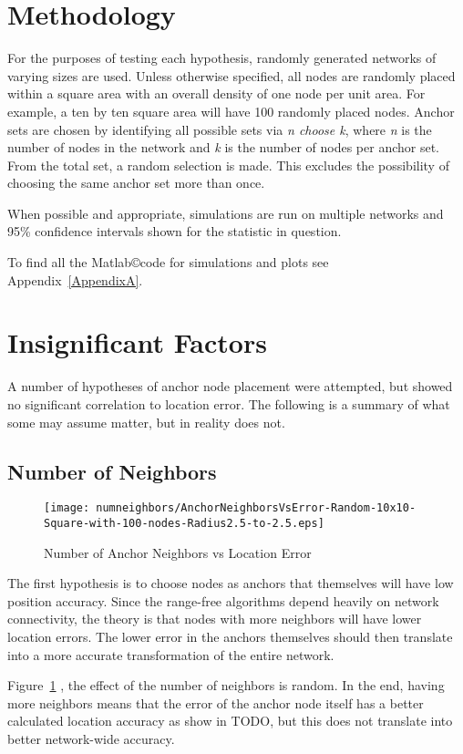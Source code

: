\section{Methodology}
For the purposes of testing each hypothesis, randomly generated networks of varying sizes are used.  Unless otherwise specified, all nodes are randomly placed within a square area with an overall density of one node per unit area.  For example, a ten by ten square area will have 100 randomly placed nodes.  Anchor sets are chosen by identifying all possible sets via \emph{n choose k}, where \emph{n} is the number of nodes in the network and \emph{k} is the number of nodes per anchor set.  From the total set, a random selection is made.  This excludes the possibility of choosing the same anchor set more than once.

When possible and appropriate, simulations are run on multiple networks and 95\% confidence intervals shown for the statistic in question.  

To find all the Matlab\copyright code for simulations and plots see Appendix~\ref{AppendixA}.

\section{Insignificant Factors}
A number of hypotheses of anchor node placement were attempted, but showed no significant correlation to location error.  The following is a summary of what some may assume matter, but in reality does not.

\subsection{Number of Neighbors}
\begin{figure}
  \centering
      \texttt{[image: numneighbors/AnchorNeighborsVsError-Random-10x10-Square-with-100-nodes-Radius2.5-to-2.5.eps]}
    \caption{Number of Anchor Neighbors vs Location Error}
    \label{fig:Neighbors1}
\end{figure}

The first hypothesis is to choose nodes as anchors that themselves will have low position accuracy.  Since the range-free algorithms depend heavily on network connectivity, the theory is that nodes with more neighbors will have lower location errors.  The lower error in the anchors themselves should then translate into a more accurate transformation of the entire network.

Figure~\ref{fig:Neighbors1} , the effect of the number of neighbors is random.  In the end, having more neighbors means that the error of the anchor node itself has a better calculated location accuracy as show in TODO, but this does not translate into better network-wide accuracy.


